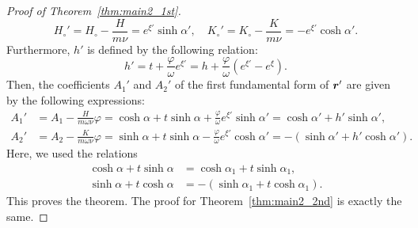 \documentclass[a4paper]{amsart}
\def\br{\mbox{\boldmath $r$}}
\theoremstyle{definition}
\begin{document}
\begin{proof}[Proof of Theorem~\ref{thm:main2_1st}]
\begin{equation}
H_\circ' 
= H_\circ - \frac{H}{m\nu} = e^{\xi'} \sinh \alpha',\quad
K_\circ' 
= K_\circ - \frac{K}{m\nu} = - e^{\xi'} \cosh \alpha'.
\end{equation}
Furthermore, $h'$ is defined by the following relation:
\begin{equation}
h' 
= t + \frac{\varphi}{\omega}e^{\xi'}
= h + \frac{\varphi}{\omega}(e^{\xi'} - e^\xi).
\end{equation}
Then, the coefficients $A_1'$ and $A_2'$ of the first fundamental form of $\br'$ are given by the following expressions:
\begin{equation}
\begin{aligned}
A_1' &= A_1 - \frac{H}{m \omega \nu} \varphi
= \cosh \alpha + t \sinh \alpha + \frac{\varphi}{\omega} e^{\xi'} \sinh \alpha'
= \cosh \alpha' + h' \sinh \alpha',\\
A_2' &= A_2 - \frac{K}{m \omega \nu} \varphi
= \sinh \alpha + t \sinh \alpha - \frac{\varphi}{\omega} e^{\xi'} \cosh \alpha'
= - (\sinh \alpha' + h' \cosh \alpha').
\end{aligned}
\end{equation}
Here, we used the relations
\begin{equation}
\begin{aligned}
\cosh \alpha + t \sinh \alpha &= \cosh \alpha_1 + t \sinh \alpha_1, \\
\sinh \alpha + t \cosh \alpha &= - (\sinh \alpha_1 + t \cosh \alpha_1).
\end{aligned}
\end{equation}
This proves the theorem.
The proof for Theorem~\ref{thm:main2_2nd} is exactly the same.
\end{proof}
%
\end{document}
